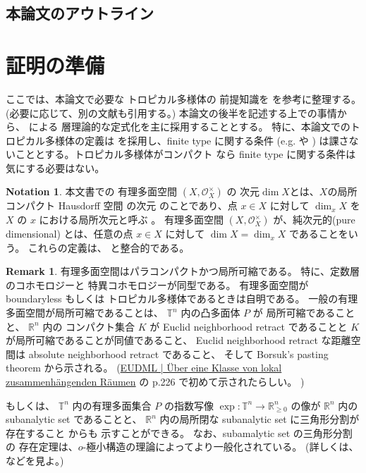 \documentclass[a4paper,dvipdfmx,reqno,12pt]{amsart}
\theoremstyle{definition}
\newtheorem{notation}[theorem]{Notation}
\newtheorem{remark}[theorem]{Remark}
\newcommand{\opn}[1]{\operatorname{#1}}
\numberwithin{equation}{section}
\begin{document}
\subsection{本論文のアウトライン}



\section{証明の準備}

ここでは、本論文で必要な
トロピカル多様体の
前提知識を
\cite{mikhalkin2018tropical,MR4637248,demedrano2023chern}
を参考に整理する。
(必要に応じて、別の文献も引用する。)
本論文の後半を記述する上での事情から、
\cite{MR4637248}による
層理論的な定式化を主に採用することとする。
特に、本論文でのトロピカル多様体の定義は
\cite[Definition 6.1]{gross2019sheaftheoretic}
を採用し、finite type に関する条件
(e.g. \cite[Definition 7.1.14]{mikhalkin2018tropical} や
\cite[Definition 2.3 (4)]{demedrano2023chern})
は課さないこととする。トロピカル多様体がコンパクト
なら finite type に関する条件は気にする必要はない。

\begin{notation}
本文書での
有理多面空間 $(X,\mathcal{O}_X^{\times})$ 
\cite[Definition 2.2]{MR4246795} の
次元$\dim X$とは、$X$の局所コンパクト Hausdorff 空間
の次元\cite[Chapter III. Definition 9.4]{MR842190}
のことであり、点 $x\in X$ に対して
$\dim_x X$ を $X$ の $x$ における局所次元と呼ぶ
\cite[Chapter III. Definition 9.10]{MR842190}。
有理多面空間
$(X,\mathcal{O}_X^{\times})$
が、純次元的(pure dimensional)
とは、任意の点 $x\in X$ に対して
$\dim X=\dim_x X$ であることをいう。
これらの定義は、
\cite[Definition 7.1.1]{mikhalkin2018tropical}
と整合的である。
\end{notation}

\begin{remark}
有理多面空間はパラコンパクトかつ局所可縮である。
特に、定数層のコホモロジーと
特異コホモロジーが同型である。
有理多面空間が
boundaryless もしくは
トロピカル多様体であるときは自明である。
一般の有理多面空間が局所可縮であることは、
$\mathbb{T}^{n}$ 内の凸多面体 $P$ が
局所可縮であることと、
$\mathbb{R}^{n}$ 内の コンパクト集合 $K$ が Euclid 
neighborhood retract であることと
$K$が局所可縮であることが同値であること、
Euclid neighborhood retract な距離空間は
absolute neighborhood retract であること、
そして Borsuk's pasting theorem から示される。
(\href{https://eudml.org/doc/212574}{EUDML | Über eine Klasse von lokal zusammenhängenden Räumen}
の p.226 で初めて示されたらしい。
)

もしくは、
$\mathbb{T}^{n}$ 内の有理多面集合 $P$ の指数写像
$\opn{exp}\colon \mathbb{T}^{n}\to 
\mathbb{R}^{n}_{\geq 0}$ の像が $\mathbb{R}^{n}$
内の subanalytic set であることと、
$\mathbb{R}^{n}$ 内の局所閉な
subanalytic set に三角形分割が存在すること
\cite{MR760983} からも
示すことができる。
なお、subamalytic set の三角形分割の
存在定理は、$o$-極小構造の理論によってより一般化されている。
(詳しくは、\cite[Theorem II]{MR1463945} などを見よ。)
\end{remark}
\end{document}
